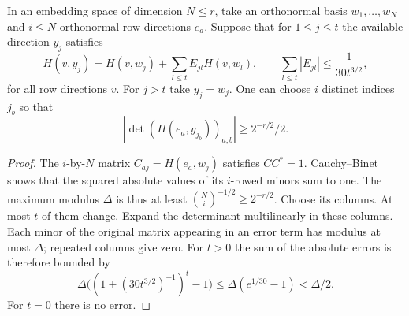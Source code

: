 \begin{auxlemma}
\label{lem:light-block-directions}
In an embedding space of dimension \(N\le r\), take an orthonormal
basis \(w_1,\ldots,w_N\) and \(i\le N\) orthonormal row
directions \(e_a\). Suppose that for \(1\le j\le t\) the available
direction \(y_j\) satisfies
\[
 H(v,y_j)=H(v,w_j)+\sum_{l\le t}E_{jl}H(v,w_l),
 \qquad \sum_{l\le t}|E_{jl}|\le\frac1{30t^{3/2}},
\]
for all row directions \(v\). For \(j>t\) take \(y_j=w_j\).
One can choose \(i\) distinct indices \(j_b\) so that
\[
 \left|\det(H(e_a,y_{j_b}))_{a,b}\right|\ge 2^{-r/2}/2 .
\]
\end{auxlemma}
\begin{proof}
The \(i\)-by-\(N\) matrix \(C_{aj}=H(e_a,w_j)\) satisfies
\(CC^*=1\). Cauchy--Binet shows that the squared absolute values
of its \(i\)-rowed minors sum to one. The maximum modulus \(\Delta\)
is thus at least \(\binom Ni^{-1/2}\ge2^{-r/2}\). Choose its columns.
At most \(t\) of them change. Expand the determinant multilinearly
in these columns. Each minor of the original matrix appearing in
an error term has modulus at most \(\Delta\); repeated columns
give zero. For \(t>0\) the sum of the absolute errors is therefore
bounded by
\[
 \Delta\bigl((1+(30t^{3/2})^{-1})^t-1\bigr)
 \le\Delta(e^{1/30}-1)<\Delta/2 .
\]
For \(t=0\) there is no error.
\end{proof}

